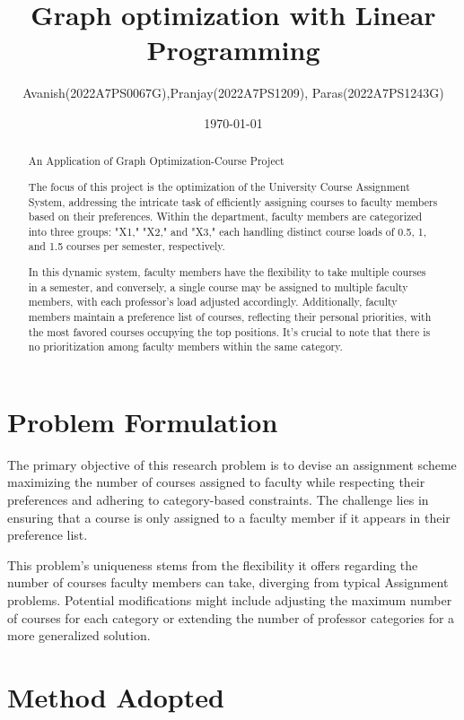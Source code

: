 \documentclass{article}
\title{Graph optimization with Linear Programming}
\author{Avanish(2022A7PS0067G),Pranjay(2022A7PS1209), Paras(2022A7PS1243G)}
\date{\today}
\begin{document}
	
	\maketitle
	
	\begin{abstract}
			
		An Application of Graph Optimization-Course Project
		
		The focus of this project is the optimization of the University Course Assignment System, addressing the intricate task of efficiently assigning courses to faculty members based on their preferences. Within the department, faculty members are categorized into three groups: "X1," "X2," and "X3," each handling distinct course loads of 0.5, 1, and 1.5 courses per semester, respectively.
		
		In this dynamic system, faculty members have the flexibility to take multiple courses in a semester, and conversely, a single course may be assigned to multiple faculty members, with each professor's load adjusted accordingly. Additionally, faculty members maintain a preference list of courses, reflecting their personal priorities, with the most favored courses occupying the top positions. It's crucial to note that there is no prioritization among faculty members within the same category.
		
	\end{abstract}


	\section{Problem Formulation}
	
	The primary objective of this research problem is to devise an assignment scheme maximizing the number of courses assigned to faculty while respecting their preferences and adhering to category-based constraints. The challenge lies in ensuring that a course is only assigned to a faculty member if it appears in their preference list.
	
	This problem's uniqueness stems from the flexibility it offers regarding the number of courses faculty members can take, diverging from typical Assignment problems. Potential modifications might include adjusting the maximum number of courses for each category or extending the number of professor categories for a more generalized solution.
	
	\section{Method Adopted} 
	
\end{document}
